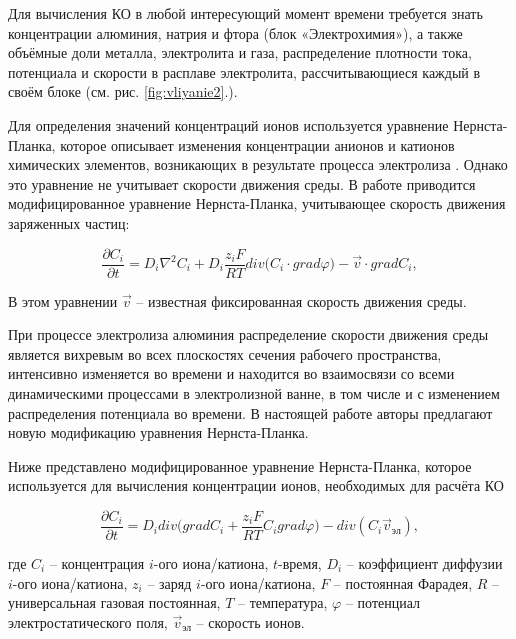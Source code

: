 \documentclass[]{pmi}
\def\phi{\varphi}
\begin{document}
Для вычисления КО в любой интересующий момент времени требуется знать концентрации алюминия, натрия и фтора (блок «Электрохимия»), а также объёмные доли металла, электролита и газа, распределение плотности тока, потенциала и скорости в расплаве электролита, рассчитывающиеся каждый в своём блоке (см. рис. \ref{fig:vliyanie2}.). 

Для определения значений концентраций ионов используется уравнение Нернста-Планка, которое описывает изменения концентрации анионов и катионов химических элементов, возникающих в результате процесса электролиза \cite{litlink:burger}. Однако это уравнение не учитывает скорости движения среды. В работе \cite{litlink:damaskin} приводится модифицированное уравнение Нернста-Планка, учитывающее скорость движения заряженных частиц:

\begin{equation}\label{eq:NPeq}
\frac{\partial C_i}{\partial t} = D_i\nabla^{2}C_i+D_i\frac{z_iF}{RT}div\big(C_i \cdot grad\phi\big) - \overrightarrow{v} \cdot gradC_i,
\end{equation}

В этом уравнении $\overrightarrow{v}$ – известная фиксированная скорость движения среды. 

При процессе электролиза алюминия распределение скорости движения среды является вихревым во всех плоскостях сечения рабочего пространства, интенсивно изменяется во времени и находится во взаимосвязи со всеми динамическими процессами в электролизной ванне, в том числе и с изменением распределения потенциала во времени. В настоящей работе авторы предлагают новую модификацию уравнения Нернста-Планка.


Ниже представлено модифицированное уравнение Нернста-Планка, которое используется для вычисления концентрации ионов, необходимых для расчёта КО

\begin{equation}\label{eq:NPeqmod}
\frac{\partial C_i}{\partial t} = D_idiv\bigg(gradC_i + \frac{z_iF}{RT}C_igrad\phi\bigg) - div(C_i \overrightarrow{v}_{\text{эл}}),
\end{equation}

где $C_i$ – концентрация $i$-ого иона/катиона, $t$-время, $D_i$ – коэффициент диффузии $i$-ого иона/катиона, $z_i$ – заряд $i$-ого иона/катиона, $F$ – постоянная Фарадея, $R$ – универсальная газовая постоянная, $T$ – температура, $\phi$ – потенциал электростатического поля, $\overrightarrow{v}_\text{эл}$ – скорость ионов.
\end{document}
